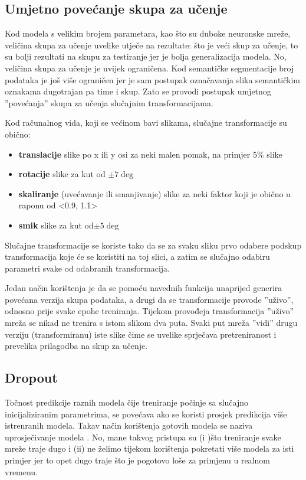 \documentclass[times, utf8, diplomski, numeric]{fer}
\begin{document}
\subsection{Umjetno povećanje skupa za učenje}
\label{chap:dataset_perturbations}

Kod modela s velikim brojem parametara, kao što su duboke neuronske mreže, veličina skupa za učenje uvelike utječe na rezultate: što je veći skup za učenje, to su bolji rezultati na skupu za testiranje jer je bolja generalizacija modela. No, veličina skupa za učenje je uvijek ograničena. Kod semantičke segmentacije broj podataka je još više ograničen jer je sam postupak označavanja slika semantičkim oznakama dugotrajan pa time i skup.
Zato se provodi postupak umjetnog ''povećanja'' skupa za učenja slučajnim transformacijama.

Kod računalnog vida, koji se većinom bavi slikama, slučajne transformacije su obično:
\begin{itemize}
  \item
  	\textbf{translacije} slike po x ili y osi za neki malen pomak, na primjer 5\% slike
  \item
    \textbf{rotacije} slike za kut od $\pm 7\deg$
  \item
  	\textbf{skaliranje} (uvećavanje ili smanjivanje) slike za neki faktor koji je obično u raponu od <0.9, 1.1>
  \item
    \textbf{smik} slike za kut od$\pm 5\deg$
\end{itemize}

Slučajne transformacije se koriste tako da se za svaku sliku prvo odabere podskup transformacija koje će se koristiti na toj slici, a zatim se slučajno odabiru parametri svake od odabranih transformacija.

Jedan način korištenja je da se pomoću navednih funkcija unaprijed generira povećana verzija skupa podataka, a drugi da se transformacije provode ''uživo'', odnosno prije svake epohe treniranja. Tijekom provođeja transformacija ''uživo'' mreža se nikad ne trenira s istom slikom dva puta. Svaki put mreža ''vidi'' drugu verziju (transformiranu) iste slike čime se uvelike sprječava pretreniranost i prevelika prilagodba na skup za učenje.

\subsection{Dropout}

Točnost predikcije raznih modela čije treniranje počinje sa slučajno inicijaliziranim parametrima, se povećava ako se koristi prosjek predikcija više istrenranih modela. Takav način korištenja gotovih modela se naziva uprosječivanje modela . No, mane takvog pristupa su (i )što treniranje svake mreže traje dugo i (ii) ne želimo tijekom korištenja pokretati više modela za isti primjer jer to opet dugo traje što je pogotovo loše za primjenu u realnom vremenu.
\end{document}

